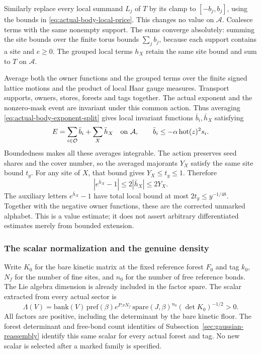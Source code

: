 Similarly replace every local summand $L_j$ of $T$ by its clamp
to $[-b_j,b_j]$, using the bounds in
\eqref{eq:actual-body-local-price}. This changes no value on
$\mathcal A$. Coalesce terms with the same nonempty support.
The sums converge absolutely: summing the site bounds over the
finite torus bounds $\sum_j b_j$, because each support contains
a site and $e\ge0$. The grouped local terms $h_X$ retain the
same site bound and sum to $T$ on $\mathcal A$.

Average both the owner functions and the grouped terms over the
finite signed lattice motions and the product of local Haar
gauge measures. Transport supports, owners, stores, forests and
tags together. The actual exponent and the nonzero-mask event are
invariant under this common action. Thus averaging
\eqref{eq:actual-body-exponent-split} gives local invariant
functions $\bar b_i,\bar h_X$ satisfying
\begin{equation}\label{eq:actual-body-averaged}
 E=\sum_{i\in\mathcal O}\bar b_i+\sum_X\bar h_X
 \quad\hbox{on }\mathcal A,\qquad
 \bar b_i\le-\alpha\,\mathrm{hot}(z)^2s_i.
\end{equation}
Boundedness makes all these averages integrable. The action
preserves seed shares and the cover number, so the averaged
majorants $Y_X$ satisfy the same site bound $t_y$.
For any site of $X$, that bound gives $Y_X\le t_y\le1$.
Therefore
\[
 |e^{\bar h_X}-1|\le2|\bar h_X|\le2Y_X.
\]
The auxiliary letters $e^{\bar h_X}-1$ have total local bound
at most $2t_y\le y^{-1/48}$. Together with the negative owner
functions, these are the corrected unmarked alphabet. This is a
value estimate; it does not assert arbitrary differentiated
estimates merely from bounded extension.

\subsubsection{The scalar normalization and the genuine density}

Write $K_0$ for the bare kinetic matrix at the fixed reference
forest $F_0$ and tag $k_0$, $N_f$ for the number of fine sites,
and $n_0$ for the number of free reference bonds. The Lie algebra
dimension is already included in the factor $\mathrm{spare}$.
The
scalar extracted from every actual sector is
\begin{equation}\label{eq:actual-body-loading}
 \Lambda(V)=\mathrm{bank}(V)\,\mathrm{pref}(\beta)
       e^{P.v N_f}\,\mathrm{spare}(J,\beta)^{n_0}
       (\det K_0)^{-1/2}>0.
\end{equation}
All factors are positive, including the determinant by the bare
kinetic floor. The forest determinant and free-bond count
identities of Subsection~\ref{sec:gaussian-reassembly} identify
this same scalar for every actual forest and tag. No new scalar
is selected after a marked family is specified.

